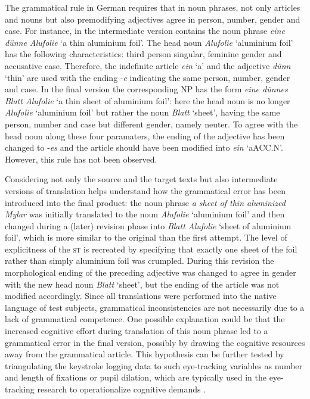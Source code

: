 \documentclass[output=paper]{LSP/langsci}
\begin{document}
The grammatical rule in German requires that in noun phrases, not only articles and nouns but also premodifying adjectives agree in person, number, gender and case. For instance, in  the intermediate version contains the noun phrase \textit{eine dünne Alufolie} `a thin aluminium foil'. The head noun \textit{Alufolie} `aluminium foil' has the following characteristics: third person singular, feminine gender and accusative case. Therefore, the indefinite article \textit{ein} `a' and the adjective \textit{dünn} `thin' are used with the ending -\textit{e} indicating the same person, number, gender and case. In the final version the corresponding NP has the form \textit{eine dünnes Blatt Alufolie} `a thin sheet of aluminium foil': here the head noun is no longer \textit{Alufolie} `aluminium foil' but rather the noun \textit{Blatt} `sheet', having the same person, number and case but different gender, namely neuter. To agree with the head noun along these four paramaters, the ending of the adjective has been changed to -\textit{es} and the article should have been modified into \textit{ein} `a{\tiny ACC.N}'. However, this rule has not been observed.

Considering not only the source and the target texts but also intermediate versions of translation helps understand how the grammatical error has been introduced into the final product: the noun phrase \textit{a sheet of thin aluminized Mylar} was initially translated to the noun \textit{Alufolie} `aluminium foil' and then changed during a (later) revision phase into \textit{Blatt Alufolie} `sheet of aluminium foil', which is more similar to the original than the first attempt. The level of explicitness of the \textsc{st} is recreated by specifying that exactly one sheet of the foil rather than simply aluminium foil was crumpled. During this revision the morphological ending of the preceding adjective was changed to agree in gender with the new head noun \textit{Blatt} `sheet', but the ending of the article was not modified accordingly. Since all translations were performed into the native language of test subjects, grammatical inconsistencies are not necessarily due to a lack of grammatical competence. One possible explanation could be that the increased cognitive effort during translation of this noun phrase led to a grammatical error in the final version, possibly by drawing the cognitive resources away from the grammatical article. This hypothesis can be further tested by triangulating the keystroke logging data to such eye-tracking variables as number and length of fixations or pupil dilation, which are typically used in the eye-tracking research to operationalize cognitive demands \citep[e.g.][]{Pavlovic2009}.
\end{document}
